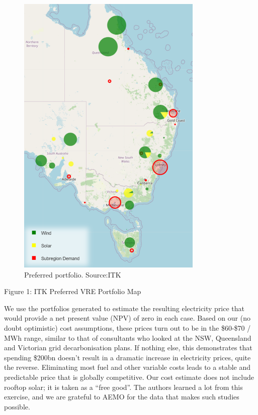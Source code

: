 \documentclass[
  letterpaper,
  DIV=11,
  numbers=noendperiod]{scrartcl}
\begin{document}
\begin{figure}[H]

{\centering \includegraphics[width=3.49583in,height=5.46875in]{./media/media/image1.png}

}

\caption{Preferred portfolio. Source:ITK}

\end{figure}%

Figure 1: ITK Preferred VRE Portfolio Map

We use the portfolios generated to estimate the resulting electricity
price that would provide a net present value (NPV) of zero in each case.
Based on our (no doubt optimistic) cost assumptions, these prices turn
out to be in the \$60-\$70 / MWh range, similar to that of consultants
who looked at the NSW, Queensland and Victorian grid decarbonisation
plans. If nothing else, this demonstrates that spending \$200bn doesn't
result in a dramatic increase in electricity prices, quite the reverse.
Eliminating most fuel and other variable costs leads to a stable and
predictable price that is globally competitive. Our cost estimate does
not include rooftop solar; it is taken as a ``free good''. The authors
learned a lot from this exercise, and we are grateful to AEMO for the
data that makes such studies possible.
\end{document}
